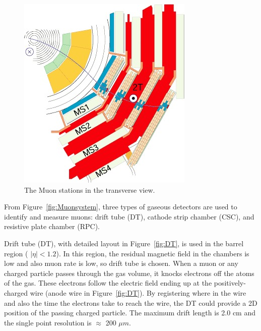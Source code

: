 \begin{figure}
\centering
\includegraphics[width=.8\textwidth]{figures/MuStations.jpg}
\caption{The Muon stations in the transverse view. }
\label{fig:MuonStation}
\end{figure}
  

From Figure~\ref{fig:Muonsystem}, three types of gaseous detectors are used to identify and measure muons: drift tube (DT), cathode strip chamber (CSC), and resistive plate chamber (RPC). 

Drift tube (DT), with detailed layout in Figure~\ref{fig:DT}, is used in the barrel region ( $|\eta| < 1.2$).  In this region, the residual magnetic field in the chambers is low and also muon rate is low, so drift tube is chosen. When a muon or any charged particle passes through the gas volume, it knocks electrons off the atoms of the gas. These electrons follow the electric field ending up at the 
positively-charged wire (anode wire in Figure~\ref{fig:DT}). By registering where in the wire and also the time the electrons take to reach the wire, the DT could provide a 2D position of the passing charged particle.  
The maximum drift length is 2.0 cm and the single point resolution is $\approx$ 200 $\mu m$.
 
